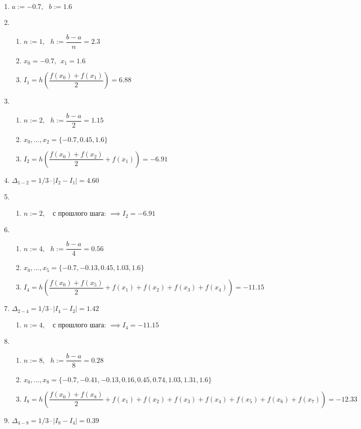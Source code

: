 \documentclass[a4paper, 14pt]{article}
\begin{document}
\begin{enumerate}
    \item $a:= -0.7,~~~b:=1.6$
    \item
    \begin{enumerate}
        \item $n:=1, ~~~ h:=\dfrac{b-a}{n}=2.3$
        \item $x_0 = -0.7, ~~ x_1 = 1.6$
        \item $I_1 = h(\dfrac{f(x_0)+f(x_1)}{2}) = 6.88$
    \end{enumerate}

    \item
    \begin{enumerate}
        \item $n:=2, ~~~ h:=\dfrac{b-a}{2}=1.15$
        \item $x_0,...,x_2 = \{-0.7, 0.45, 1.6\}$
        \item $I_2 = h(\dfrac{f(x_0)+f(x_2)}{2} + f(x_1)) = -6.91$
    \end{enumerate}
    \item $\Delta_{1-2} = 1/3 \cdot |I_2 - I_1| = \mathbf{4.60}$

    \item
    \begin{enumerate}
        \item $n:=2, ~~~ \text{ с прошлого шага: } \implies I_2 = -6.91$
    \end{enumerate}

    \item
    \begin{enumerate}
        \item $n:=4, ~~~ h:=\dfrac{b-a}{4}=0.56$
        \item $x_0,...,x_5 = \{ -0.7,-0.13,0.45,1.03,1.6\}$
        \item $I_4 = h(\dfrac{f(x_0)+f(x_5)}{2} + f(x_1)+f(x_2)+f(x_3)+f(x_4)) = -11.15$
    \end{enumerate}
    \item $\Delta_{2-4} = 1/3 \cdot |I_4 - I_2| = \mathbf{1.42}$

    \begin{enumerate}
        \item $n:=4, ~~~ \text{ с прошлого шага: } \implies I_4 = -11.15$
    \end{enumerate}

    \item
    \begin{enumerate}
        \item $n:=8, ~~~ h:=\dfrac{b-a}{8}=0.28$
        \item $x_0,...,x_8 = \{  -0.7,-0.41,-0.13,0.16,0.45,0.74,1.03,1.31,1.6\}$
        \item $I_8 = h(\dfrac{f(x_0)+f(x_8)}{2} + f(x_1)+f(x_2)+f(x_3)+f(x_4)+f(x_5)+f(x_6)+f(x_7)) = -12.33$
    \end{enumerate}
    \item $\Delta_{4-8} = 1/3 \cdot |I_8 - I_4| = \mathbf{0.39}$

\end{enumerate}
\end{document}

